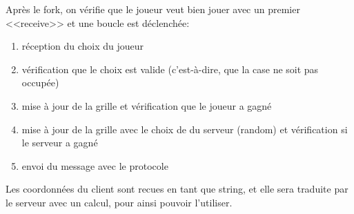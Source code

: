 \documentclass{article}
\begin{document}
	Après le fork, on vérifie que le joueur veut bien jouer avec un premier <<receive>> et une boucle est déclenchée:
	\begin{enumerate}
		\item réception du choix du joueur
		\item vérification que le choix est valide (c'est-à-dire, que la case ne soit pas occupée)
		\item mise à jour de la grille et vérification que le joueur a gagné
		\item mise à jour de la grille avec le choix de du serveur (random) et vérification si le serveur a gagné
		\item envoi du message avec le protocole
	\end{enumerate}
	
	Les coordonnées du client sont recues en tant que string, et elle sera traduite par le serveur avec un calcul, pour ainsi pouvoir l'utiliser.
	
\end{document}
